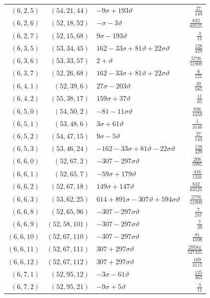 \begin{longtable}{rrlr}
$(6,2,5)$ & $(54,21,44)$ & $-9\sigma+193\vartheta$ & $\frac{27}{143}$\\
$(6,2,6)$ & $(52,18,52)$ & $-\sigma-3\vartheta$ & $\frac{832}{63525}$\\
$(6,2,7)$ & $(52,15,68)$ & $9\sigma-193\vartheta$ & $\frac{3}{11}$\\
$(6,3,5)$ & $(53,34,45)$ & $162-33\sigma+81\vartheta+22\sigma\vartheta$ & $\frac{128}{429}$\\
$(6,3,6)$ & $(53,33,57)$ & $2+\vartheta$ & $\frac{5776}{51909}$\\
$(6,3,7)$ & $(52,26,68)$ & $162-33\sigma+81\vartheta+22\sigma\vartheta$ & $\frac{6}{121}$\\
$(6,4,1)$ & $(52,39,6)$ & $27\sigma-203\vartheta$ & $\frac{49}{585}$\\
$(6,4,2)$ & $(55,38,17)$ & $159\sigma+37\vartheta$ & $\frac{11}{65}$\\
$(6,5,0)$ & $(54,50,2)$ & $-81-11\sigma\vartheta$ & $\frac{836}{4459}$\\
$(6,5,1)$ & $(53,48,6)$ & $3\sigma+61\vartheta$ & $\frac{5}{3146}$\\
$(6,5,2)$ & $(54,47,15)$ & $9\sigma-5\vartheta$ & $\frac{27}{143}$\\
$(6,5,3)$ & $(53,46,24)$ & $-162-33\sigma+81\vartheta-22\sigma\vartheta$ & $\frac{128}{429}$\\
$(6,6,0)$ & $(52,67,2)$ & $-307-297\sigma\vartheta$ & $\frac{208}{5985}$\\
$(6,6,1)$ & $(52,65,7)$ & $-59\sigma+179\vartheta$ & $\frac{416}{1331}$\\
$(6,6,2)$ & $(52,67,18)$ & $149\sigma+147\vartheta$ & $\frac{832}{63525}$\\
$(6,6,3)$ & $(53,62,25)$ & $614+891\sigma-307\vartheta+594\sigma\vartheta$ & $\frac{5776}{51909}$\\
$(6,6,8)$ & $(52,65,96)$ & $-307-297\sigma\vartheta$ & $\frac{7}{247}$\\
$(6,6,9)$ & $(52,58,101)$ & $-307-297\sigma\vartheta$ & $\frac{7}{39}$\\
$(6,6,10)$ & $(52,67,110)$ & $-307-297\sigma\vartheta$ & $\frac{81}{4108}$\\
$(6,6,11)$ & $(52,67,111)$ & $307+297\sigma\vartheta$ & $\frac{29584}{527325}$\\
$(6,6,12)$ & $(52,67,112)$ & $307+297\sigma\vartheta$ & $\frac{169}{3115}$\\
$(6,7,1)$ & $(52,95,12)$ & $-3\sigma-61\vartheta$ & $\frac{125}{363}$\\
$(6,7,2)$ & $(52,95,21)$ & $-9\sigma+5\vartheta$ & $\frac{3}{11}$\\

\end{longtable}

